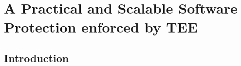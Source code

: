 \chapter{A Practical and Scalable Software Protection enforced by TEE}
\label{chp:static-protection} 

%
%

\section{Introduction}
%
